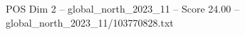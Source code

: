 \begin{textsample}{POS Dim 2 – global\_north\_2023\_11 – Score 24.00 – global\_north\_2023\_11/103770828.txt}
\end{textsample}
